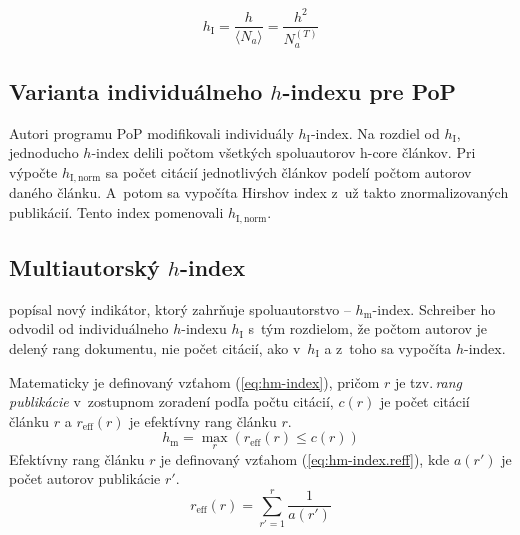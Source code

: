 \begin{equation}
\label{eq:hi-index}
h_{\mathrm{I}} = \frac{h}{\langle N_a \rangle} = \frac{h^2}{N_a^{(T)}}
\end{equation}


\subsection{Varianta individuálneho $h$-indexu pre PoP}
\label{sec:hinorm}

Autori programu PoP modifikovali individuály
$h_{\mathrm{I}}$-index.    Na rozdiel od $h_{\mathrm{I}}$, jednoducho
$h$-index delili počtom všetkých
spoluautorov h-core článkov.  Pri výpočte $h_{\mathrm{I, norm}}$ sa počet
citácií jednotlivých článkov podelí počtom autorov daného článku.  A~potom sa
vypočíta Hirshov index z~už takto znormalizovaných publikácií.  Tento index pomenovali $h_{\mathrm{I, norm}}$.


\subsection{Multiautorský $h$-index}
\label{sec:hm-index}

\citet{Schreiber2008} popísal nový indikátor, ktorý zahrňuje spoluautorstvo
-- $h_{\mathrm{m}}$-index.  Schreiber ho odvodil od individuálneho $h$-indexu
$h_{\mathrm{I}}$ s~tým rozdielom, že počtom autorov je delený rang dokumentu,
nie počet citácií, ako v~$h_{\mathrm{I}}$ a z~toho sa vypočíta $h$-index.

Matematicky je definovaný vzťahom (\ref{eq:hm-index}), pričom $r$ je tzv.\,\emph{rang
  publikácie} v~zostupnom zoradení podľa počtu citácií, $c(r)$ je počet citácií
článku $r$ a $r_{\mathrm{eff}}(r)$ je efektívny rang článku $r$.
\begin{equation}
\label{eq:hm-index}
h_{\mathrm{m}} = \max_r{(r_{\mathrm{eff}}(r) \leq c(r))}
\end{equation}
Efektívny rang článku $r$ je definovaný vzťahom (\ref{eq:hm-index.reff}), kde $a(r')$ je
počet autorov publikácie $r'$.
\begin{equation}
\label{eq:hm-index.reff}
r_{\mathrm{eff}}(r) = \sum_{r'=1}^r{\frac{1}{a(r')}}
\end{equation}


